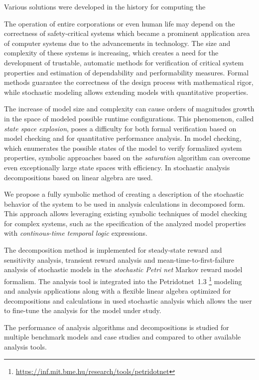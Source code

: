 Various solutions were developed in the history for computing the 

The operation of entire corporations or even human life may depend on
the correctness of safety-critical systems which became a prominent
application area of computer systems due to the advancements in
technology. The size and complexity of these systems is increasing,
which creates a need for the development of trustable, automatic methods
for verification of critical system properties and estimation of
dependability and performability measures. Formal methods guarantee
the correctness of the design process with mathematical rigor, while
stochastic modeling allows extending models with quantitative
properties.

The increase of model size and complexity can cause orders of
magnitudes growth in the space of modeled possible runtime
configurations. This phenomenon, called \emph{state space explosion},
poses a difficulty for both formal verification based on model
checking and for quantitative performance analysis. In model checking,
which enumerates the possible states of the model to verify formalized
system properties, symbolic approaches based on the \emph{saturation}
algorithm can overcome even exceptionally large state spaces with
efficiency. In stochastic analysis decompositions based on linear
algebra are used.

We propose a fully symbolic method of creating a description of the
stochastic behavior of the system to be used in analysis calculations
in decomposed form. This approach allows leveraging existing symbolic
techniques of model checking for complex systems, such as the
specification of the analyzed model properties with
\emph{continous-time temporal logic}  expressions.

The decomposition method is implemented for steady-state reward and
sensitivity analysis, transient reward analysis and
mean-time-to-first-failure analysis of stochastic models in the
\emph{stochastic Petri net}  Markov reward model
formalism. The analysis tool is integrated into the Petridotnet~1.3%
\footnote{\url{https://inf.mit.bme.hu/research/tools/petridotnet}}
modeling and analysis applications along with a flexible linear
algebra optimized for decompositions and calculations in used
stochastic analysis which allows the user to fine-tune the analysis
for the model under study.

The performance of analysis algorithms and decompositions is studied
for multiple benchmark models and case studies and compared to other
available analysis tools.
